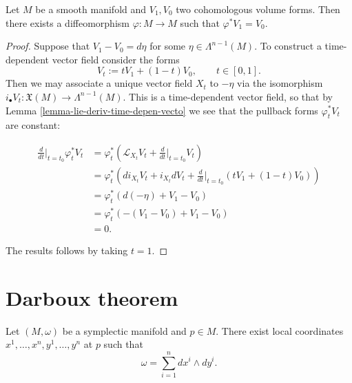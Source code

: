 \begin{theorem}
\label{theorem-moser-trick-volume}
Let $M$ be a smooth manifold and $V_1, V_0$
two cohomologous volume forms.
Then there exists a diffeomorphism $\varphi:M
\to M$
such that $\varphi^*V_1=V_0$.
\end{theorem}

\begin{proof}
Suppose that $V_1-V_0=d\eta$ for some $\eta
\in \Lambda^{n-1}(M)$.
To construct a time-dependent vector field
consider the forms
$$
V_t:=tV_1+(1-t)V_0,\qquad t \in [0,1].
$$
Then we may associate a unique vector field
$X_t$ to $-\eta$
via the isomorphism $i_\bullet
V_t:\mathfrak{X}(M) \to \Lambda^{n-1}(M)$.
This is a time-dependent vector field,
so that by Lemma
\ref{lemma-lie-deriv-time-depen-vecto}
we see that the pullback forms
$\varphi^*_tV_t$ are constant:

$$
\begin{aligned}
\frac{d}{dt}\Big|_{t=t_0}\varphi^*_tV_t
&=\varphi^*_t
\left(\mathcal{L}_{X_t}V_t
+\frac{d}{dt}\Big|_{t=t_0}V_t\right)\\
&=\varphi^*_t
\left(di_{X_t}V_t+i_{X_t}dV_t
+\frac{d}{dt}\Big|_{t=t_0}(tV_1+(1-t)V_0)
\right)\\
&=\varphi^*_t
\left(d(-\eta)
+V_1-V_0\right)\\
&=\varphi^*_t(-(V_1-V_0)+V_1-V_0)\\
&=0.
\end{aligned}
$$

\noindent
The results follows by taking $t=1$.
\end{proof}

\section{Darboux theorem}
\label{section-darboux-theorem}

\begin{theorem}[Darboux]
\label{theorem-darboux}
Let $(M,\omega)$ be a symplectic manifold and
$p \in M$.
There exist local coordinates
$x^1,…,x^n,y^1,…,y^n$ at $p$ such that
$$
\omega=\sum_{i=1}^n dx^i \wedge dy^i.
$$
\end{theorem}

